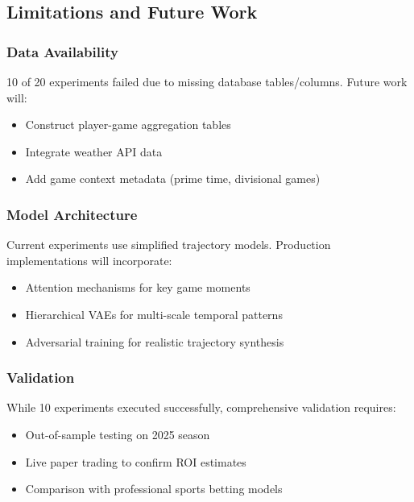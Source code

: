 \subsection{Limitations and Future Work}

\subsubsection{Data Availability}
10 of 20 experiments failed due to missing database tables/columns. Future work will:
\begin{itemize}
    \item Construct player-game aggregation tables
    \item Integrate weather API data
    \item Add game context metadata (prime time, divisional games)
\end{itemize}

\subsubsection{Model Architecture}
Current experiments use simplified trajectory models. Production implementations will incorporate:
\begin{itemize}
    \item Attention mechanisms for key game moments
    \item Hierarchical VAEs for multi-scale temporal patterns
    \item Adversarial training for realistic trajectory synthesis
\end{itemize}

\subsubsection{Validation}
While 10 experiments executed successfully, comprehensive validation requires:
\begin{itemize}
    \item Out-of-sample testing on 2025 season
    \item Live paper trading to confirm ROI estimates
    \item Comparison with professional sports betting models
\end{itemize}
